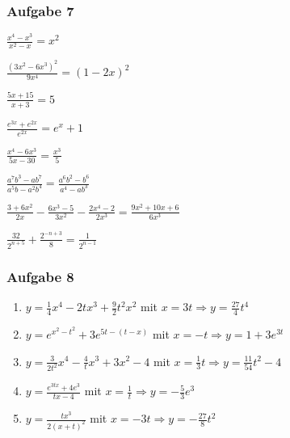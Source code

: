 \subsubsection{Aufgabe 7}
\begin{enumerate}
\begin{multicols}{2}
	\item \quad $ \frac{x^4-x^3}{x^2-x}=x^2 $													%
	\item \quad $ \frac{(3x^2-6x^3)^2}{9x^4}=(1-2x)^2 $										%
	\item \quad $ \frac{5x+15}{x+3}=5 $														%
	\item \quad $ \frac{e^{3x}+e^{2x}}{e^{2x}}=e^x + 1 $											%
	\item \quad $ \frac{x^4-6x^3}{5x-30}=\frac{x^3}{5} $								%
	\item \quad $ \frac{a^7b^3-ab^7}{a^5b-a^2b^4}=\frac{a^6b^2-b^6}{a^4-ab^3} $	%
	\item \quad $ \frac{3+6x^2}{2x} - \frac{6x^3-5}{3x^2} - \frac{2x^4-2}{2x^3}=\frac{9x^2+10x+6}{6x^3} $			%
	\item \quad $ \frac{32}{2^{n+5}} + \frac{2^{-n+3}}{8}=\frac{1}{2^{n-1}} $						%
\end{multicols} 
\end{enumerate}

\subsubsection{Aufgabe 8} 
\begin{enumerate}
	\item \quad $ y = \frac{1}{4}x^4-2tx^3+\frac{9}{2}t^2x^2 $ mit $ x = 3t \Rightarrow y = \frac{27}{4}t^4 $					%
	\item \quad $ y = e^{x^2-t^2}+3e^{5t-(t-x)} $ mit $ x = -t \Rightarrow y = 1 + 3e^{3t} $							%
	\item \quad $ y = \frac{3}{2t^2}x^4 - \frac{4}{t}x^3 + 3x^2 - 4 $ mit $ x = \frac{1}{3}t \Rightarrow y = \frac{11}{54}t^2 - 4 $		%
	\item \quad $ y = \frac{e^{3tx}+4e^3}{tx-4} $ mit $ x = \frac{1}{t} \Rightarrow y = -\frac{5}{3}e^3 $					%
	\item \quad $ y = \frac{tx^3}{2(x+t)^2} $ mit $x = -3t \Rightarrow y = -\frac{27}{8}t^2 $				%
\end{enumerate}

